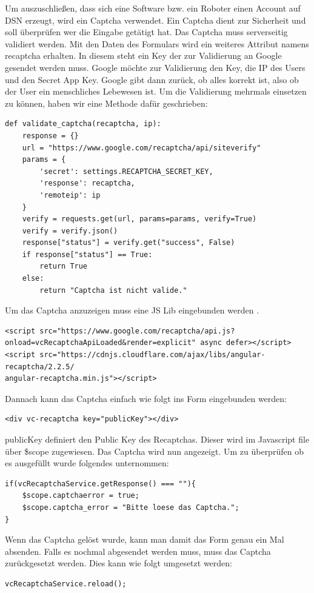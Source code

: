 Um auszuschließen, dass sich eine Software bzw. ein Roboter einen Account auf DSN erzeugt, wird ein Captcha verwendet. Ein Captcha dient zur Sicherheit und soll überprüfen wer die Eingabe getätigt hat. Das Captcha muss serverseitig validiert werden. Mit den Daten des Formulars wird ein weiteres Attribut namens recaptcha erhalten. In diesem steht ein Key der zur Validierung an Google gesendet werden muss. Google möchte zur Validierung den Key, die IP des Users und den Secret App Key. Google gibt dann zurück, ob alles korrekt ist, also ob der User ein menschliches Lebewesen ist. Um die Validierung mehrmals einsetzen zu können, haben wir eine Methode dafür geschrieben:

\begin{lstlisting}
def validate_captcha(recaptcha, ip):
    response = {}
    url = "https://www.google.com/recaptcha/api/siteverify"
    params = {
        'secret': settings.RECAPTCHA_SECRET_KEY,
        'response': recaptcha,
        'remoteip': ip
    }
    verify = requests.get(url, params=params, verify=True)
    verify = verify.json()
    response["status"] = verify.get("success", False)
    if response["status"] == True:
        return True
    else:
        return "Captcha ist nicht valide." 
\end{lstlisting}


Um das Captcha anzuzeigen muss eine JS Lib eingebunden werden \cite{CAPTCHA}.
\begin{lstlisting}
<script src="https://www.google.com/recaptcha/api.js?
onload=vcRecaptchaApiLoaded&render=explicit" async defer></script>
<script src="https://cdnjs.cloudflare.com/ajax/libs/angular-recaptcha/2.2.5/
angular-recaptcha.min.js"></script>
\end{lstlisting}


Dannach kann das Captcha einfach wie folgt ins Form eingebunden werden:
\begin{lstlisting}
<div vc-recaptcha key="publicKey"></div>
\end{lstlisting}

publicKey definiert den Public Key des Recaptchas. Dieser wird im Javascript file über \$scope zugewiesen. Das Captcha wird nun angezeigt. Um zu überprüfen ob es ausgefüllt wurde folgendes unternommen:
\begin{lstlisting}
if(vcRecaptchaService.getResponse() === ""){
    $scope.captchaerror = true;
    $scope.captcha_error = "Bitte loese das Captcha.";
}
\end{lstlisting}

Wenn das Captcha gelöst wurde, kann man damit das Form genau ein Mal absenden. Falls es nochmal abgesendet werden muss, muss das Captcha zurückgesetzt werden. Dies kann wie folgt umgesetzt werden:
\begin{lstlisting}
vcRecaptchaService.reload();
\end{lstlisting}

